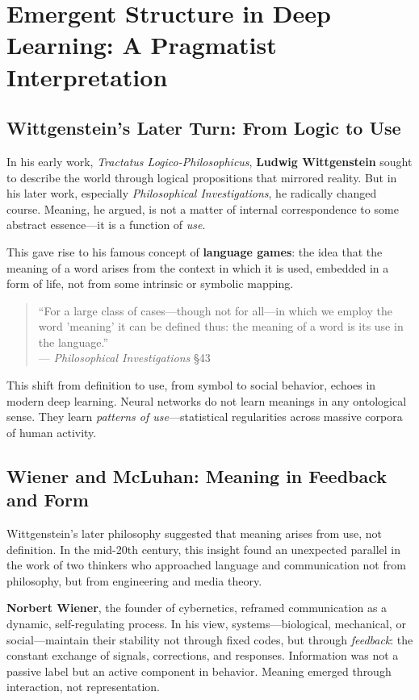 \section{Emergent Structure in Deep Learning: A Pragmatist Interpretation}

\subsection{Wittgenstein’s Later Turn: From Logic to Use}

In his early work, \textit{Tractatus Logico-Philosophicus}, \textbf{Ludwig Wittgenstein} sought to describe the world through logical propositions that mirrored reality. But in his later work, especially \textit{Philosophical Investigations}, he radically changed course. Meaning, he argued, is not a matter of internal correspondence to some abstract essence—it is a function of \emph{use}.

This gave rise to his famous concept of \textbf{language games}: the idea that the meaning of a word arises from the context in which it is used, embedded in a form of life, not from some intrinsic or symbolic mapping.

\begin{quote}
    ``For a large class of cases—though not for all—in which we employ the word 'meaning' it can be defined thus: the meaning of a word is its use in the language.''\\
    — \textit{Philosophical Investigations} \S43
\end{quote}

This shift from definition to use, from symbol to social behavior, echoes in modern deep learning. Neural networks do not learn meanings in any ontological sense. They learn \emph{patterns of use}—statistical regularities across massive corpora of human activity.

\subsection{Wiener and McLuhan: Meaning in Feedback and Form}

Wittgenstein’s later philosophy suggested that meaning arises from use, not definition. In the mid-20th century, this insight found an unexpected parallel in the work of two thinkers who approached language and communication not from philosophy, but from engineering and media theory.

\textbf{Norbert Wiener}, the founder of cybernetics, reframed communication as a dynamic, self-regulating process. In his view, systems—biological, mechanical, or social—maintain their stability not through fixed codes, but through \emph{feedback}: the constant exchange of signals, corrections, and responses. Information was not a passive label but an active component in behavior. Meaning emerged through interaction, not representation.

